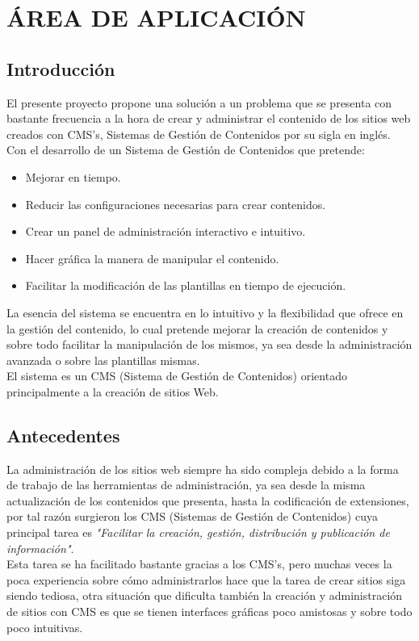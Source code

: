 
\chapter{\'AREA DE APLICACI\'ON}
\newpage
\section{Introducci\'on}

El presente proyecto propone una soluci\'on a un problema que se presenta con bastante frecuencia a la hora de crear y administrar el contenido de los sitios web creados con CMS's, Sistemas de Gesti\'on de Contenidos por su sigla en ingl\'es.\\
Con el desarrollo de un Sistema de Gesti\'on de Contenidos que pretende:

\begin{itemize}
\item Mejorar en tiempo.
\item Reducir las configuraciones necesarias para crear contenidos.
\item Crear un panel de administraci\'on interactivo e intuitivo.
\item Hacer gr\'afica la manera de manipular el contenido.
\item Facilitar la modificaci\'on de las plantillas en tiempo de ejecuci\'on.
\end{itemize}

La esencia del sistema se encuentra en lo intuitivo y la flexibilidad que ofrece en la gesti\'on del contenido, lo cual pretende mejorar la creaci\'on de contenidos y sobre todo facilitar la manipulaci\'on de los mismos, ya sea desde la administraci\'on avanzada o sobre las plantillas mismas.\\
El sistema es un CMS (Sistema de Gesti\'on de Contenidos) orientado principalmente a la creaci\'on de sitios Web.

\section{Antecedentes}
La administraci\'on de los sitios web siempre ha sido compleja debido a la forma de trabajo de las herramientas de administraci\'on, ya sea desde la misma actualizaci\'on de los contenidos que presenta, hasta la codificaci\'on de extensiones, por tal raz\'on surgieron los CMS (Sistemas de Gesti\'on de Contenidos) cuya principal tarea es  \textit{"Facilitar la creaci\'on, gesti\'on, distribuci\'on y publicaci\'on de informaci\'on"}.\\
Esta tarea se ha facilitado bastante gracias a los CMS's, pero muchas veces la poca experiencia sobre c\'omo administrarlos hace que la tarea de crear sitios siga siendo tediosa, otra situaci\'on que dificulta tambi\'en la creaci\'on y administraci\'on de sitios con CMS es que se tienen interfaces gr\'aficas poco amistosas y sobre todo poco intuitivas.
\newpage
